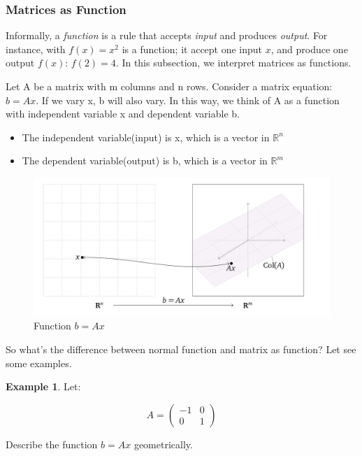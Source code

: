 \documentclass[a4paper,12pt]{article}
\begin{document}
\subsubsection{Matrices as Function}
    Informally, a \textit{function} is a rule that accepts \textit{input} and produces \textit{output}. For instance, with \(f(x)=x^2\) is a function; it accept one input \(x\), and produce one output \(f(x)\): \(f(2)=4\). In this subsection, we interpret matrices as functions.
\begin{tcolorbox}[title=Definition,colframe=blue!70!black, colback=blue!5!white]
Let A be a matrix with m columns and n rows. Consider a matrix equation: \(b=Ax\). If we vary x, b will also vary. In this way, we think of A as a function with independent variable x and dependent variable b. 
\begin{itemize}
    \item The independent variable(input) is x, which is a vector in \(\mathbb{R}^n\)
    \item The dependent variable(output) is b, which is a vector in \(\mathbb{R}^m\)
\end{itemize}
\end{tcolorbox}
\begin{figure}[H]
    \centering
    \includegraphics[width=1\linewidth]{function.png}
    \caption{Function \(b=Ax\)}
    \label{fig:enter-label}
\end{figure}

So what's the difference between normal function and matrix as function? Let see some examples.

\textbf{Example 1}. Let:

\[
    A = 
    \left( \begin{array}{cc}
    -1 & 0\\
    0 & 1
    \end{array} \right)
\]

Describe the function \(b=Ax\) geometrically.
\end{document}
